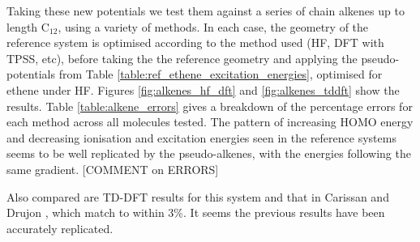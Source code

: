 \documentclass[journal=jctcce,manuscript=article]{achemso}
\begin{document}
Taking these new potentials we test them against a series of chain alkenes up to length C\(_{12}\), using a variety of methods. In each case, the geometry of the reference system is optimised according to the method used (HF, DFT with TPSS, etc), before taking the the reference geometry and applying the pseudo-potentials from Table \ref{table:ref_ethene_excitation_energies}, optimised for ethene under HF. Figures \ref{fig:alkenes_hf_dft} and \ref{fig:alkenes_tddft} show the results. Table \ref{table:alkene_errors} gives a breakdown of the percentage errors for each method across all molecules tested. The pattern of increasing HOMO energy and decreasing ionisation and excitation energies seen in the reference systems seems to be well replicated by the pseudo-alkenes, with the energies following the same gradient. [COMMENT on ERRORS]

Also compared are TD-DFT results for this system and that in Carissan and Drujon \cite{drujon_pseudopotentials_2013}, which match to within 3\%. It seems the previous results have been accurately replicated.
\end{document}
